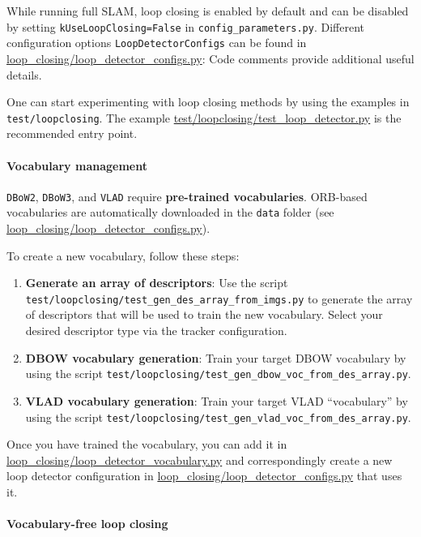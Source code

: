 \documentclass{article}
\let\oldparagraph\paragraph
\renewcommand{\paragraph}[1]{\oldparagraph{#1}\mbox{}}
\begin{document}
While running full SLAM, loop closing is enabled by default and can be
disabled by setting \texttt{kUseLoopClosing=False} in
\texttt{config\_parameters.py}. Different configuration options
\texttt{LoopDetectorConfigs} can be found in
\url{loop_closing/loop_detector_configs.py}: Code comments provide
additional useful details.

One can start experimenting with loop closing methods by using the
examples in \texttt{test/loopclosing}. The example
\href{./test/loopclosing/test_loop_detector.py}{test/loopclosing/test\_loop\_detector.py}
is the recommended entry point.

\hypertarget{vocabulary-management}{%
\paragraph{Vocabulary management}\label{vocabulary-management}}

\texttt{DBoW2}, \texttt{DBoW3}, and \texttt{VLAD} require
\textbf{pre-trained vocabularies}. ORB-based vocabularies are
automatically downloaded in the \texttt{data} folder (see
\url{loop_closing/loop_detector_configs.py}).

To create a new vocabulary, follow these steps:

\begin{enumerate}
\def\labelenumi{\arabic{enumi}.}
\item
  \textbf{Generate an array of descriptors}: Use the script \\
  \texttt{test/loopclosing/test\_gen\_des\_array\_from\_imgs.py} to
  generate the array of descriptors that will be used to train the new
  vocabulary. Select your desired descriptor type via the tracker
  configuration.
\item
  \textbf{DBOW vocabulary generation}: Train your target DBOW vocabulary
  by using the script
  \texttt{test/loopclosing/test\_gen\_dbow\_voc\_from\_des\_array.py}.
\item
  \textbf{VLAD vocabulary generation}: Train your target VLAD
  ``vocabulary'' by using the script
  \texttt{test/loopclosing/test\_gen\_vlad\_voc\_from\_des\_array.py}.
\end{enumerate}

Once you have trained the vocabulary, you can add it in
\url{loop_closing/loop_detector_vocabulary.py} and correspondingly
create a new loop detector configuration in
\url{loop_closing/loop_detector_configs.py} that uses it.

\hypertarget{vocabulary-free-loop-closing}{%
\paragraph{Vocabulary-free loop
closing}\label{vocabulary-free-loop-closing}}
\end{document}
